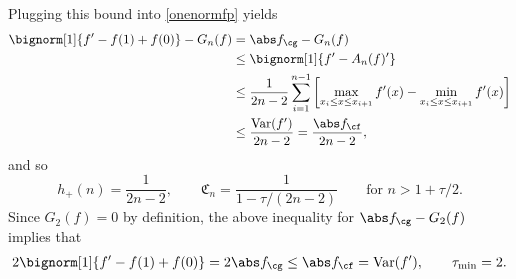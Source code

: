 Plugging this bound into \eqref{onenormfp} yields
\begin{align*}
\bignorm[1]{f'-f(1)+f(0)} - G_n(f) &= \Gnorm{f} - G_{n}(f)\\
 & \le \bignorm[1]{f' -A_n(f)'}\\
&\le \frac{1}{2n-2} \sum_{i=1}^{n-1} \left[ \max_{x_i \le x \le x_{i+1}} f'(x) - \min_{x_i \le x \le x_{i+1}} f'(x) \right] \\
& \le \frac{\Var(f')}{2n-2} = \frac{\Fnorm{f}}{2n-2},
\end{align*}
and so 
\begin{equation}\label{factor}
h_{+}(n)= \frac{1}{2n-2}, \qquad \mathfrak{C}_n =\frac{1}{1 - \tau/(2n-2)} \qquad \text{for } n>1+\tau/2.
\end{equation}
Since $G_2(f)=0$ by definition, the above inequality for $\Gnorm{f} - G_{2}(f)$ implies that
\begin{equation} \label{taumininteg}
2\bignorm[1]{f'-f(1)+f(0)} = 2 \Gnorm{f} \le \Fnorm{f} = \Var(f'), \qquad \tau_{\min}=2.
\end{equation}


